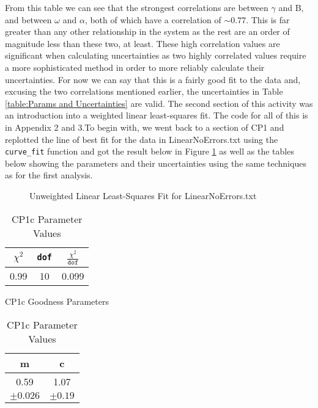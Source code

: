\documentclass[12pt]{article}
\begin{document}
    \noindent
    From this table we can see that the strongest correlations are between $\gamma$ and B, and 
    between $\omega$ and $\alpha$, both of which have a correlation of $\sim0.77$. This is far greater 
    than any other relationship in the system as the rest are an order of magnitude less than 
    these two, at least. These high correlation values are significant when calculating uncertainties 
    as two highly correlated values require a more sophisticated method in order to more reliably 
    calculate their uncertainties. For now we can say that this is a fairly good fit to the data 
    and, excusing the two correlations mentioned earlier, the uncertainties in Table 
    \ref{table:Params and Uncertainties} are valid. 
    \newline
    \newline
    The second section of this activity was an introduction into a weighted linear least-squares 
    fit. The code for all of this is in Appendix 2 and 3.To begin with, we went back to a section 
    of CP1 and replotted the line of best fit for the data in LinearNoErrors.txt using the 
    \texttt{curve\_fit} function and got the result below in Figure \ref{fig:CP1c Plot} as well 
    as the tables below showing the parameters and their uncertainties using the same techniques 
    as for the first analysis. 

    \begin{figure}[H]
        \begin{center}
           \scalebox{.6}{}
           \caption{Unweighted Linear Least-Squares Fit for LinearNoErrors.txt}
           \label{fig:CP1c Plot}
        \end{center}
    \end{figure}

    \begin{table}[H]
        \begin{minipage}{0.5\textwidth}
            \centering
            \begin{tabular}{c c c}
                \hline
                $\chi^2$ & \texttt{dof} & $\frac{\chi^2}{\texttt{dof}}$ \\
                \hline
                0.99 & 10 & 0.099 \\
                \hline
            \end{tabular}
            \caption{CP1c Goodness Parameters}
            \label{table:CP1c Goodness}
        \end{minipage}
        \begin{minipage}{0.5\textwidth}
            \centering
            \begin{tabular}{c c}
                \hline
                m & c\\
                \hline
                0.59 & 1.07 \\
                $\pm0.026$ & $\pm0.19$ \\
                \hline
            \end{tabular}
            \caption{CP1c Parameter Values}
            \label{table:CP1c Params and Uncertainties}
        \end{minipage}
    \end{table}
        
\end{document}
